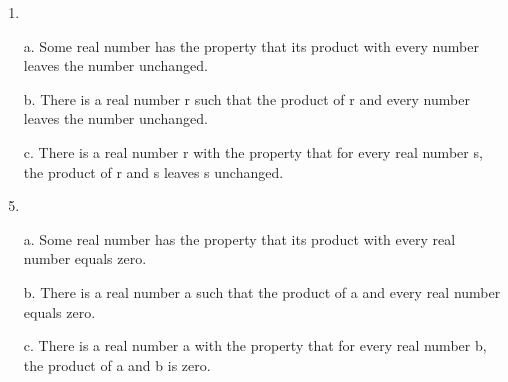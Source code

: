 \documentclass{article}
\begin{document}
\begin{enumerate}[label=\textbf{\arabic*.}]
\item %
\item[a.] Some real number has the property that its product with every number leaves the number unchanged.
\item[b.] There is a real number r such that the product of r and every number leaves the number unchanged.
\item[c.] There is a real number r with the property that for every real number s, the product of r and s leaves s unchanged.
\item %
\item[a.] Some real number has the property that its product with every real number equals zero.
\item[b.] There is a real number a such that the product of a and every real number equals zero.
\item[c.] There is a real number a with the property that for every real number b, the product of a and b is zero.

\end{enumerate}
\end{document}
